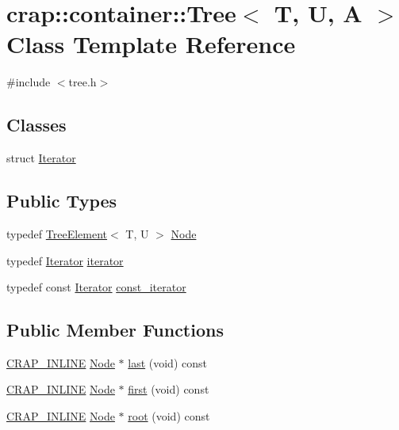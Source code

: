 \hypertarget{classcrap_1_1container_1_1_tree}{\section{crap\-:\-:container\-:\-:Tree$<$ T, U, A $>$ Class Template Reference}
\label{classcrap_1_1container_1_1_tree}
}


{\ttfamily \#include $<$tree.\-h$>$}

\subsection*{Classes}
\begin{DoxyCompactItemize}
\item 
struct \hyperlink{structcrap_1_1container_1_1_tree_1_1_iterator}{Iterator}
\end{DoxyCompactItemize}
\subsection*{Public Types}
\begin{DoxyCompactItemize}
\item 
typedef \hyperlink{structcrap_1_1container_1_1_tree_element}{Tree\-Element}$<$ T, U $>$ \hyperlink{classcrap_1_1container_1_1_tree_a03cefa95016ea47daa5e93705ad1afe7}{Node}
\item 
typedef \hyperlink{structcrap_1_1container_1_1_tree_1_1_iterator}{Iterator} \hyperlink{classcrap_1_1container_1_1_tree_a6fc9dffe6a291f6b1b6dc52ef2602eb9}{iterator}
\item 
typedef const \hyperlink{structcrap_1_1container_1_1_tree_1_1_iterator}{Iterator} \hyperlink{classcrap_1_1container_1_1_tree_ac0b874e8b0b5e75401f4acaf2880cd4d}{const\-\_\-iterator}
\end{DoxyCompactItemize}
\subsection*{Public Member Functions}
\begin{DoxyCompactItemize}
\item 
\hyperlink{compilers_8h_a5a40526b8d842e7ff731509998bb0f1c}{C\-R\-A\-P\-\_\-\-I\-N\-L\-I\-N\-E} \hyperlink{classcrap_1_1container_1_1_tree_a03cefa95016ea47daa5e93705ad1afe7}{Node} $\ast$ \hyperlink{classcrap_1_1container_1_1_tree_a58e8006b54c0d7c590144df32fd2bc08}{last} (void) const 
\item 
\hyperlink{compilers_8h_a5a40526b8d842e7ff731509998bb0f1c}{C\-R\-A\-P\-\_\-\-I\-N\-L\-I\-N\-E} \hyperlink{classcrap_1_1container_1_1_tree_a03cefa95016ea47daa5e93705ad1afe7}{Node} $\ast$ \hyperlink{classcrap_1_1container_1_1_tree_a553d5ef18bc88871c8be91e84d962eb5}{first} (void) const 
\item 
\hyperlink{compilers_8h_a5a40526b8d842e7ff731509998bb0f1c}{C\-R\-A\-P\-\_\-\-I\-N\-L\-I\-N\-E} \hyperlink{classcrap_1_1container_1_1_tree_a03cefa95016ea47daa5e93705ad1afe7}{Node} $\ast$ \hyperlink{classcrap_1_1container_1_1_tree_a635700432102a722ea8b2a6067f2e589}{root} (void) const 
\end{DoxyCompactItemize}


